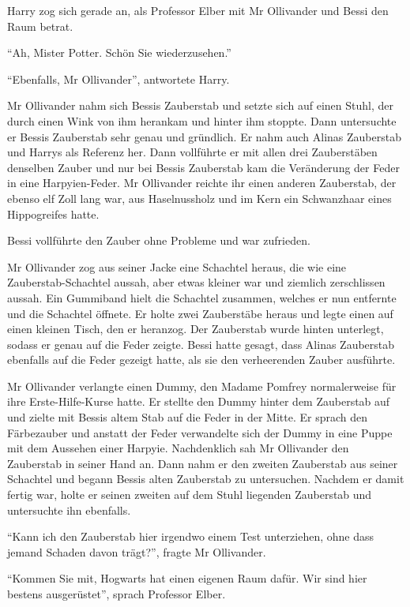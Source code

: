 Harry zog sich gerade an, als Professor Elber mit Mr Ollivander und Bessi den Raum betrat.

\enquote{Ah, Mister Potter. Schön Sie wiederzusehen.}

\enquote{Ebenfalls, Mr Ollivander}, antwortete Harry.

Mr Ollivander nahm sich Bessis Zauberstab und setzte sich auf einen Stuhl, der durch einen Wink von ihm herankam und hinter ihm stoppte. Dann untersuchte er Bessis Zauberstab sehr genau und gründlich. Er nahm auch Alinas Zauberstab und Harrys als Referenz her. Dann vollführte er mit allen drei Zauberstäben denselben Zauber und nur bei Bessis Zauberstab kam die Veränderung der Feder in eine Harpyien-Feder. Mr Ollivander reichte ihr einen anderen Zauberstab, der ebenso elf Zoll lang war, aus Haselnussholz und im Kern ein Schwanzhaar eines Hippogreifes hatte.

Bessi vollführte den Zauber ohne Probleme und war zufrieden.

Mr Ollivander zog aus seiner Jacke eine Schachtel heraus, die wie eine Zauberstab-Schachtel aussah, aber etwas kleiner war und ziemlich zerschlissen aussah. Ein Gummiband hielt die Schachtel zusammen, welches er nun entfernte und die Schachtel öffnete. Er holte zwei Zauberstäbe heraus und legte einen auf einen kleinen Tisch, den er heranzog. Der Zauberstab wurde hinten unterlegt, sodass er genau auf die Feder zeigte. Bessi hatte gesagt, dass Alinas Zauberstab ebenfalls auf die Feder gezeigt hatte, als sie den verheerenden Zauber ausführte.

Mr Ollivander verlangte einen Dummy, den Madame Pomfrey normalerweise für ihre Erste-Hilfe-Kurse hatte. Er stellte den Dummy hinter dem Zauberstab auf und zielte mit Bessis altem Stab auf die Feder in der Mitte. Er sprach den Färbezauber und anstatt der Feder verwandelte sich der Dummy in eine Puppe mit dem Aussehen einer Harpyie. Nachdenklich sah Mr Ollivander den Zauberstab in seiner Hand an. Dann nahm er den zweiten Zauberstab aus seiner Schachtel und begann Bessis alten Zauberstab zu untersuchen. Nachdem er damit fertig war, holte er seinen zweiten auf dem Stuhl liegenden Zauberstab und untersuchte ihn ebenfalls.

\enquote{Kann ich den Zauberstab hier irgendwo einem Test unterziehen, ohne dass jemand Schaden davon trägt?}, fragte Mr Ollivander.

\enquote{Kommen Sie mit, Hogwarts hat einen eigenen Raum dafür. Wir sind hier bestens ausgerüstet}, sprach Professor Elber.

